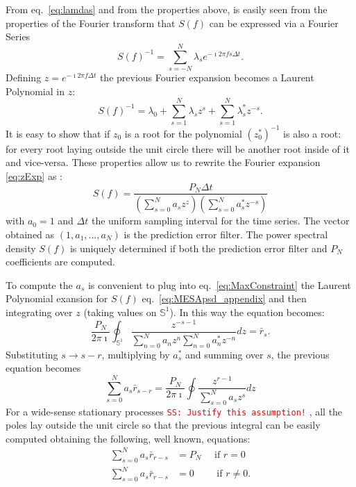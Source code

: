 \documentclass[twocolumn,showpacs,preprintnumbers,nofootinbib,prd,
superscriptaddress,10pt]{revtex4-1}
\newcommand{\sschmidt}[1]{{\textcolor{red}{\texttt{SS: #1}} }}
\begin{document}
From eq.~\eqref{eq:lamdas} and from the properties above, is easily seen from the properties of the Fourier transform that $S(f)$ can be expressed via a Fourier Series 
\begin{equation}\label{eq:PSDconstraint}
    S(f)^{-1} = \sum_{s = -N}^N \lambda_s e^{-\imath 2 \pi f s \Delta t}.
\end{equation}
Defining $z = e^{-\imath 2 \pi f \Delta t}$ the previous Fourier expansion becomes a Laurent Polynomial in $z$: 
\begin{equation}
    \label{eq:zExp}
    S(f)^{-1} = \lambda_0 + \sum_{s = 1}^N \lambda_s z^s + \sum_{s = 1}^N \lambda^*_s z^{-s}.
\end{equation}
It is easy to show that if $z_0$ is a root for the polynomial $(z_0^*)^{-1}$ is also a root: for every root laying outside the unit circle there will be another root inside of it and vice-versa. These properties allow us to rewrite the Fourier expansion \eqref{eq:zExp} as \cite{1975STIN...7714318B}:
\begin{equation}\label{eq:MESApsd_appendix}
    S(f) = \frac{P_N \Delta t}{\left(\sum_{s=0}^N a_s z^z\right)\left(\sum_{s = 0}^N a^*_s z^{-s}\right)}
\end{equation}
with $a_0 = 1$ and $\Delta t$ the uniform sampling interval for the time series. The vector obtained as $(1, a_1, \dots, a_N)$ is the prediction error filter. The power spectral density $S(f)$ is uniquely determined if both the prediction error filter and $P_N$ coefficients are computed.

To compute the $a_s$ is convenient to plug into eq.~\eqref{eq:MaxConstraint} the Laurent Polynomial exansion for $S(f)$ eq.~\eqref{eq:MESApsd_appendix} and then integrating over $z$ (taking values on ${\mathbb S^1}$). In this way the equation becomes:
\begin{equation}
    \label{eq:contourintegral}
   \frac{P_N}{2 \pi \imath} \oint _{\mathbb S^1}\frac{z^{-s - 1}}{\sum_{n = 0}^N a_n z^n \sum_{n = 0}^N a^*_n z^{-n}}dz = \bar r_s. 
\end{equation}
Substituting $s \to s - r$, multiplying by $a^*_s$ and summing over $s$, the previous equation becomes 
\begin{equation}
    \label{eq:errorFilter}
    \sum_{s = 0}^N a_s \bar r_{s - r} = \frac{P_N}{2 \pi \imath}\oint \frac{z^{r -1}}{\sum_{s = 0}^N a_s z^s}dz
\end{equation}
For a wide-sense stationary processes \sschmidt{Justify this assumption!}, all the poles lay outside the unit circle so that the previous integral can be easily computed obtaining the following, well known, equations: 
\begin{align}
    \label{eq:errorFilter1}
    \sum_{s = 0}^N a_s \bar r_{r - s} &= P_N \quad \text{ if } r = 0 \\ \label{eq:errorFilter2}
    \sum_{s = 0}^N a_s \bar r_{r - s} & = 0 \qquad \text{ if } r \neq 0.
\end{align}
\end{document}
